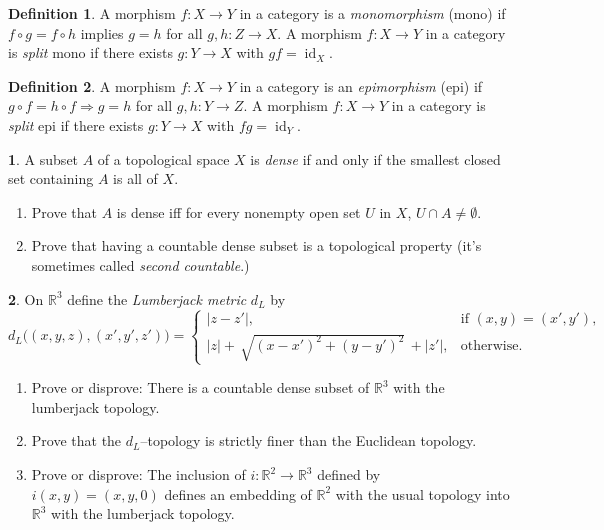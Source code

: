 \documentclass[11pt]{article}
\theoremstyle{definition}
\newtheorem*{definition*}{Definition}
\newtheorem{problem}{}
\newcommand{\bp}{\begin{problem}}
\newcommand{\ep}{\end{problem}\bigskip}
\theoremstyle{theorem}
\DeclareMathOperator{\id}{id}
\newcommand{\R}{\mathbb{R}}%
\begin{document}
\pagestyle{fancy}
\fancyfoot[R,C,L]{}

\newcommand{\Top}{\mathbf{Top}}
\newcommand{\Set}{\mathbf{Set}}




\begin{definition*}
A morphism $f:X\to Y$ in a category is a \emph{monomorphism} (mono) if $f\circ g=f\circ h$ implies $g=h$ for all $g,h:Z\to X$.  A morphism $f:X\to Y$ in a category is \emph{split} mono if there exists $g:Y\to X$ with $gf=\id_X$.  
\end{definition*}
\begin{definition*}
A morphism $f:X\to Y$ in a category is an \emph{epimorphism} (epi) if $g\circ f=h\circ f\Rightarrow g=h$ for all $g,h:Y\to Z$. A morphism $f:X\to Y$ in a category is \emph{split} epi if there exists $g:Y\to X$ with $fg=\id_Y$.  
\end{definition*}


\bp 
A subset $A$ of a topological space $X$ is \emph{dense} if and only if the smallest closed set containing $A$ is all of $X$.  
\begin{enumerate}[label=(\alph*)]
\item Prove that $A$ is dense iff for every nonempty open set $U$ in $X$, $U\cap A \neq \emptyset$.  
\item Prove that having a countable dense subset is a topological property (it's sometimes called \emph{second countable}.)
\end{enumerate}
\ep

\begin{problem}
On $\R^3$ define the \emph{Lumberjack metric} $d_L$ by
\[
d_L\big((x,y,z),(x',y',z')\big)=
\begin{cases}
|z-z'|, & \text{if } (x,y)=(x',y'),\\[2mm]
|z|+\,\sqrt{(x-x')^2+(y-y')^2}\,+|z'|, & \text{otherwise.}
\end{cases}
\]
\begin{enumerate}[label=(\alph*)]
\item Prove or disprove:  There is a countable dense subset of $\R^3$ with the lumberjack topology.
\item 
Prove that the $d_L$–topology is strictly finer than the Euclidean topology.
\item Prove or disprove:  The inclusion of $i:\R^2 \to \R^3$ defined by $i(x,y)=(x,y,0)$ defines an embedding of $\R^2$ with the usual topology into $\R^3$ with the lumberjack topology.


\end{enumerate}
\end{problem}
\end{document}
